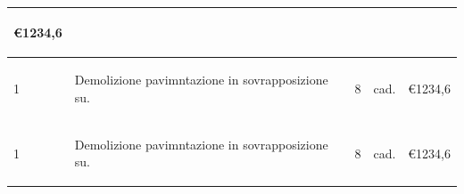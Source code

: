 \documentclass[a4paper]{article}
\begin{document}
\begin{tabular}{ | L{10mm} |  L{86mm} | L{12mm} | L{12mm} | L{16mm} | }
\begin{spacing}{0}
                      \euro\hfill 1234,6
                    \end{spacing} \\
                    \hline
                    \vspace{2.5mm}
                    \begin{spacing}{0}
                      1
                    \end{spacing} &
                    \vspace{2.5mm}
                    \begin{spacing}{0}
                    Demolizione pavimntazione in sovrapposizione su.
                    \end{spacing} &
                    \vspace{2.5mm}
                    \begin{spacing}{0}
                      8
                    \end{spacing} &
                    \vspace{2.5mm}
                    \begin{spacing}{0}
                      cad.
                    \end{spacing} &
                    \vspace{2.5mm}
                    \begin{spacing}{0}
                      \euro\hfill 1234,6
                    \end{spacing} \\
                    \hline
                    \vspace{2.5mm}
                    \begin{spacing}{0}
                      1
                    \end{spacing} &
                    \vspace{2.5mm}
                    \begin{spacing}{0}
                    Demolizione pavimntazione in sovrapposizione su.
                    \end{spacing} &
                    \vspace{2.5mm}
                    \begin{spacing}{0}
                      8
                    \end{spacing} &
                    \vspace{2.5mm}
                    \begin{spacing}{0}
                      cad.
                    \end{spacing} &
                    \vspace{2.5mm}
                    \begin{spacing}{0}
                      \euro\hfill 1234,6
                    \end{spacing} \\
                    \hline



  \end{tabular}
\end{document}
